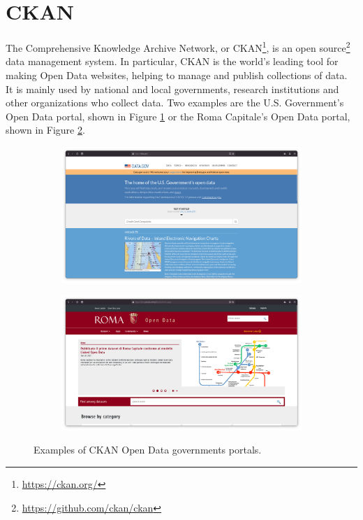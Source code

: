 \section{CKAN}
\label{sec:ckan}

The Comprehensive Knowledge Archive Network, or CKAN\footnote{\url{https://ckan.org/}}, is an open source\footnote{\url{https://github.com/ckan/ckan}} data management system. In particular, CKAN is the world's leading tool for making Open Data websites, helping to manage and publish collections of data. It is mainly used by national and local governments, research institutions and other organizations who collect data. Two examples are the U.S. Government's Open Data portal, shown in Figure \ref{fig:ckan-usa} or the Roma Capitale's Open Data portal, shown in Figure \ref{fig:ckan-roma}.

\begin{figure}
  \begin{subfigure}{.5\columnwidth}
    \centering
    \includegraphics[width=.99\linewidth]{images/ckan/ckan-usa}
    \label{fig:ckan-usa}
  \end{subfigure}%
  \begin{subfigure}{.5\columnwidth}
    \centering
    \includegraphics[width=.99\linewidth]{images/ckan/ckan-roma}
    \label{fig:ckan-roma}
  \end{subfigure}
  \caption{Examples of CKAN Open Data governments portals.}
  \label{fig:ckan-examples}
\end{figure}

